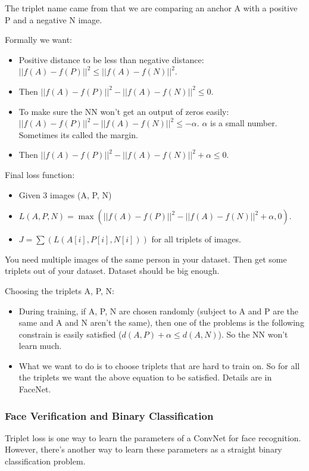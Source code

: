 The triplet name came from that we are comparing an anchor A with a positive P and a negative N image.

Formally we want:

\begin{itemize}
    \item Positive distance to be less than negative distance: $||f(A)-f(P)||^2 \leq ||f(A) - f(N)||^2$.
    \item Then $||f(A)-f(P)||^2 - ||f(A) - f(N)||^2 \leq 0$.
    \item To make sure the NN won't get an output of zeros easily: $||f(A)-f(P)||^2 - ||f(A) - f(N)||^2 \leq -\alpha$. $\alpha$ is a small number. Sometimes its called the margin.
    \item Then $||f(A)-f(P)||^2 - ||f(A) - f(N)||^2 + \alpha \leq 0$. 
\end{itemize}

Final loss function:
\begin{itemize}
    \item Given 3 images (A, P, N)
    \item $L(A, P, N) = \max (||f(A)-f(P)||^2 - ||f(A) - f(N)||^2 + \alpha, 0)$.
    \item $J = \sum(L(A[i], P[i], N[i]))$ for all triplets of images.
\end{itemize}

You need multiple images of the same person in your dataset. Then get some triplets out of your dataset. Dataset should be big enough.

Choosing the triplets A, P, N:

\begin{itemize}
    \item During training, if A, P, N are chosen randomly (subject to A and P are the same and A and N aren't the same), then one of the problems is the following constrain is easily satisfied ($d(A, P) + \alpha \leq d(A, N)$). So the NN won't learn much.
    \item What we want to do is to choose triplets that are hard to train on. So for all the triplets we want the above equation to be satisfied. Details are in FaceNet\cite{schroff2015facenet}.
\end{itemize}

\subsubsection{Face Verification and Binary Classification}
Triplet loss is one way to learn the parameters of a ConvNet for face recognition. However, there's another way to learn these parameters as a straight binary classification problem.

